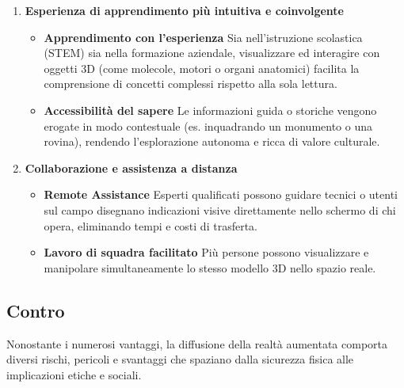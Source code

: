 \begin{enumerate}
    \item \textbf{Esperienza di apprendimento più intuitiva e coinvolgente} \newline
    \begin{itemize}
        \item \textbf{Apprendimento con l'esperienza} \newline
        Sia nell'istruzione scolastica (STEM) sia nella formazione aziendale, visualizzare ed interagire con oggetti 3D (come molecole, motori o organi anatomici) facilita la comprensione di concetti complessi rispetto alla sola lettura.
        \item \textbf{Accessibilità del sapere} \newline
        Le informazioni guida o storiche vengono erogate in modo contestuale (es. inquadrando un monumento o una rovina), rendendo l'esplorazione autonoma e ricca di valore culturale.
    \end{itemize}

    \item \textbf{Collaborazione e assistenza a distanza} \newline
    \begin{itemize}
        \item \textbf{Remote Assistance} \newline
        Esperti qualificati possono guidare tecnici o utenti sul campo disegnano indicazioni visive direttamente nello schermo di chi opera, eliminando tempi e costi di trasferta.
        \item \textbf{Lavoro di squadra facilitato} \newline
        Più persone possono visualizzare e manipolare simultaneamente lo stesso modello 3D nello spazio reale.
    \end{itemize}

\end{enumerate}


\subsection{Contro}

Nonostante i numerosi vantaggi, la diffusione della realtà aumentata comporta diversi rischi, pericoli e svantaggi che spaziano dalla sicurezza fisica alle implicazioni etiche e sociali.

